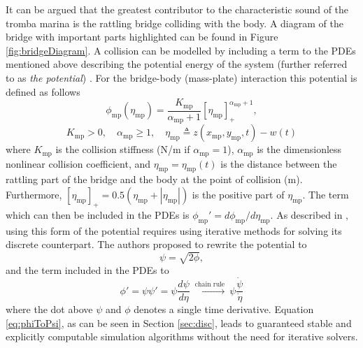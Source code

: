 \documentclass[dvipsnames, pdftex]{article}
\def\SWcomment[#1]{\textcolor{Bittersweet}{#1}}
\def\MDcomment[#1]{\textcolor{Blue}{#1}}
\def\um{w}
\def\up{z}
\begin{document}
%
It can be argued that the greatest contributor to the characteristic sound of the tromba marina is the rattling bridge colliding with the body. A diagram of the bridge with important parts highlighted can be found in Figure \ref{fig:bridgeDiagram}. A collision can be modelled by including a term to the PDEs mentioned above describing the potential energy of the system (further referred to as \textit{the potential}) \cite{Ducceschi2019}. For the bridge-body (mass-plate) interaction this potential is defined as follows %
\begin{equation}\label{eq:potential}
    \phi_\text{mp}(\eta_\text{mp}) = \frac{K_\text{mp}}{\alpha_\text{mp}+1}[\eta_\text{mp}]_+^{\alpha_\text{mp}+1},
\end{equation}
\begin{equation*}
    K_\text{mp}>0, \quad \alpha_\text{mp}\geq 1, \quad \eta_\text{mp}\triangleq \up(x_\text{mp},y_\text{mp},t) - \um(t)
\end{equation*}
where $K_\text{mp}$ is the collision stiffness (N/m if $\alpha_\text{mp} = 1$), $\alpha_\text{mp}$ is the dimensionless nonlinear collision coefficient, and $\eta_\text{mp} = \eta_\text{mp}(t)$ is the distance between the rattling part of the bridge and the body at the point of collision (m). Furthermore, $[\eta_\text{mp}]_+ = 0.5(\eta_\text{mp}+|\eta_\text{mp}|)$ is the positive part of $\eta_\text{mp}$. The term which can then be included in the PDEs is $\phi_\text{mp}' = d\phi_\text{mp}/d\eta_\text{mp}$. As described in \cite{Falaize2016a:SMC2020, Falaize2016b:SMC2020, Lopes:SMC2020, Ducceschi2019}, using this form of the potential requires using iterative methods for solving its discrete counterpart. The authors proposed to rewrite the potential to
\begin{equation}
    \psi = \sqrt{2\phi},
\end{equation}
and the term included in the PDEs to
\begin{equation}\label{eq:phiToPsi}
    \phi' = \psi\psi' = \psi\frac{d\psi}{d\eta}\  \xrightarrow{\text{chain rule}}\ \psi\frac{\dot \psi}{\dot \eta}
\end{equation}
where the dot above $\psi$ and $\phi$ denotes a single time derivative. Equation \eqref{eq:phiToPsi}, as can be seen in Section \ref{sec:disc}, leads to guaranteed stable and explicitly computable simulation algorithms without the need for iterative solvers. 
\end{document}
